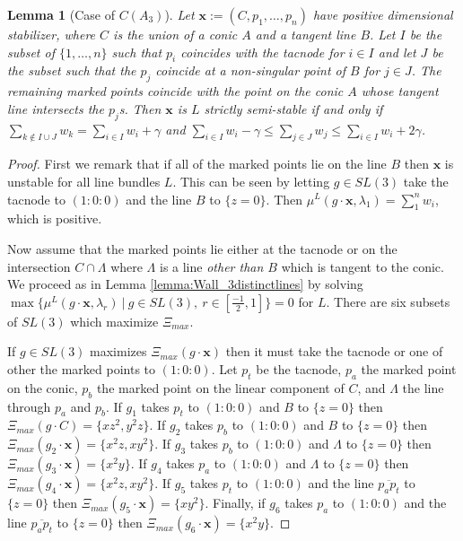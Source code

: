 \documentclass{amsart}
\numberwithin{equation}{section}
\newtheorem{lemma}[prop]{Lemma}
\theoremstyle{definition}
\begin{document}
\begin{lemma}[Case of $C(A_3)$] \label{Lemma:wallC(A_3)}
    Let $\mathbf{x} := (C, p_1, \dots , p_n)$ have positive dimensional stabilizer, where $C$ is the union of a conic $A$ and a tangent line $B$. Let $I$ be the subset of $\{1, \dots ,n\}$ such that $p_i$ coincides with the tacnode for $i \in I$ and let $J$ be the subset such that the $p_j$ coincide at a non-singular point of $B$ for $j \in J$. The remaining marked points coincide with the point on the conic $A$ whose tangent line intersects the $p_j$s. Then $\mathbf{x}$ is $L$ strictly semi-stable if and only if $\sum_{k \notin I \cup J} w_k = \sum_{i \in I} w_i + \gamma$ and $\sum_{i \in I} w_i - \gamma \leq \sum_{j \in J} w_j \leq \sum_{i \in I} w_i + 2 \gamma$.
\end{lemma}

\begin{proof}
First we remark that if all of the marked points lie on the line $B$ then $\mathbf{x}$ is unstable for all line bundles $L$. This can be seen by letting $g \in SL(3)$ take the tacnode to $(1:0:0)$ and the line $B$ to $\{z=0\}$. Then $\mu^L(g \cdot \mathbf{x}, \lambda_1) = \sum_1^n w_i$, which is positive.

Now assume that the marked points lie either at the tacnode or on the intersection $C \cap \Lambda$ where $\Lambda$ is a line \textit{other than $B$} which is tangent to the conic. We proceed as in Lemma \ref{lemma:Wall_3distinctlines} by solving $\max \{ \mu^L(g \cdot \mathbf{x}, \lambda_r) \ | \ g \in SL(3), \ r \in [\frac{-1}{2}, 1] \} = 0$ for $L$. There are  six subsets of $SL(3)$ which maximize $\Xi_{max}$. 

If $g\in SL(3)$ maximizes $\Xi_{max}(g \cdot \mathbf{x})$ then it must take the tacnode or one of other the marked points to $(1:0:0)$. Let $p_t$ be the tacnode, $p_a$ the marked point on the conic, $p_b$ the marked point on the linear component of $C$, and $\Lambda$ the line through $p_a$ and $p_b$. If $g_1$ takes $p_t$ to $(1:0:0)$ and $B$ to $\{z=0\}$ then $\Xi_{max}( g \cdot C) = \{xz^2, y^2z\}$. If $g_2$ takes $p_b$ to $(1:0:0)$ and $B$ to $\{z=0\}$ then $\Xi_{max} ( g_2 \cdot \mathbf{x}) = \{x^2z,  xy^2 \}$. If $g_3$ takes $p_b$ to $(1:0:0)$ and $\Lambda$ to $\{z=0\}$ then $\Xi_{max} ( g_3 \cdot \mathbf{x}) = \{x^2y\}$. If $g_4$ takes  $p_a$ to $(1:0:0)$ and $\Lambda$ to $\{z=0\}$ then $\Xi_{max} ( g_4 \cdot \mathbf{x}) = \{ x^2z, xy^2\}$. If $g_5$ takes $p_t$ to $(1:0:0)$ and the line $\overline{p_a p_t}$ to $\{z=0\}$ then $\Xi_{max} ( g_5 \cdot \mathbf{x}) = \{ xy^2\}$. Finally, if $g_6$ takes $p_a$ to $(1:0:0)$ and the line $\overline{p_a p_t}$ to $\{z=0\}$ then $\Xi_{max} ( g_6 \cdot \mathbf{x}) = \{x^2y\}$.


\end{proof}
\end{document}
